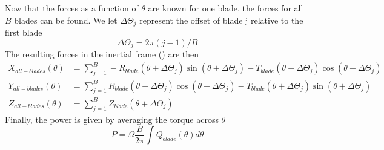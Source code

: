 \documentclass{article}
\begin{document}
Now that the forces as a function of $\theta$ are known for one blade, the forces for all $B$ blades can be found.  We let $\Delta \Theta_j$ represent the offset of blade j relative to the first blade
\begin{equation}
\Delta\Theta_j = 2\pi (j-1) / B
\end{equation}
The resulting forces in the inertial frame () are then
\begin{equation}
\begin{aligned}
  X_{all-blades}(\theta) &= \sum_{j=1}^B -R_{blade}(\theta + \Delta\Theta_j) \sin(\theta + \Delta\Theta_j) - T_{blade}(\theta + \Delta\Theta_j) \cos(\theta + \Delta\Theta_j) \\
  Y_{all-blades}(\theta) &= \sum_{j=1}^B R_{blade}(\theta + \Delta\Theta_j) \cos(\theta + \Delta\Theta_j) - T_{blade}(\theta + \Delta\Theta_j) \sin(\theta + \Delta\Theta_j) \\
  Z_{all-blades}(\theta) &= \sum_{j=1}^B Z_{blade}(\theta + \Delta\Theta_j)
\end{aligned}
\end{equation}
Finally, the power is given by averaging the torque across $\theta$
\begin{equation}
P = \Omega \frac{B}{2\pi} \int Q_{blade}(\theta) d\theta
\end{equation}




\end{document}
